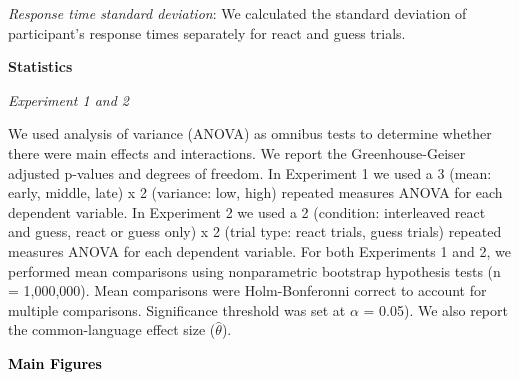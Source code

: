 \documentclass[12pt,letterpaper]{article}
\newcommand{\SectionHeader}[1]{\noindent\textbf{\Large{\textcolor{black}{#1}}}\normalsize }
\begin{document}
\emph{Response time standard deviation}: We calculated the standard deviation of participant’s response times separately for react and guess trials.

\noindent\textbf{\textcolor{mydarkblue}{Statistics}}

\noindent\emph{Experiment 1 and 2}

We used analysis of variance (ANOVA) as omnibus tests to determine whether there were main effects and interactions. We report the Greenhouse-Geiser adjusted p-values and degrees of freedom. In Experiment 1 we used a 3 (mean: early, middle, late) x 2 (variance: low, high) repeated measures ANOVA for each dependent variable. In Experiment 2 we used a 2 (condition: interleaved react and guess, react or guess only) x 2 (trial type: react trials, guess trials) repeated measures ANOVA for each dependent variable. For both Experiments 1 and 2, we performed mean comparisons using nonparametric bootstrap hypothesis tests (n = 1,000,000). Mean comparisons were Holm-Bonferonni correct to account for multiple comparisons. Significance threshold was set at $\alpha$ = 0.05). We also report the common-language effect size ($\hat{\theta}$).





\SectionHeader{Main Figures}
\end{document}
